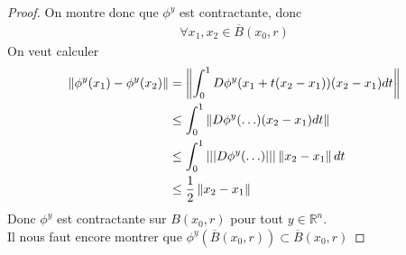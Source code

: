 \documentclass[../main.tex]{subfiles}
\begin{document}
\begin{proof}
On montre donc que $\phi^{y}$ est contractante, donc
\begin{align*}
	\forall x_1,x_2 \in \overline{B}( x_0,r) 
\end{align*}
On veut calculer
\begin{align*}
	\left\lVert \phi^{y}( x_1)  - \phi^{y}( x_2) \right\rVert &= \left\lVert  \int_{ 0 }^{ 1 } D\phi^{y}( x_1 + t( x_2-x_1) ) ( x_2-x_1) dt\right\rVert \\
						&\leq \int_{ 0 }^{ 1 } \left\lVert D \phi^{y}( \ldots) ( x_2-x_1) dt\right\rVert \\
						& \leq \int_{ 0 }^{ 1 }\left\vert\left\vert\left\vert D \phi^{y}( \ldots) \right\vert\right\vert\right\vert \left\lVert x_2-x_1\right\rVert dt\\
					&\leq \frac{1}{2}\left\lVert x_2-x_1\right\rVert 		
\end{align*}
Donc $\phi^{y}$ est contractante sur $B( x_0,r) $ pour tout $y \in \mathbb{R}^n$.\\
Il nous faut encore montrer que $ \phi^{y}( \overline{B}( x_0,r) ) \subset \overline{B}( x_0,r) $




				
\end{proof}




	
\end{document}
